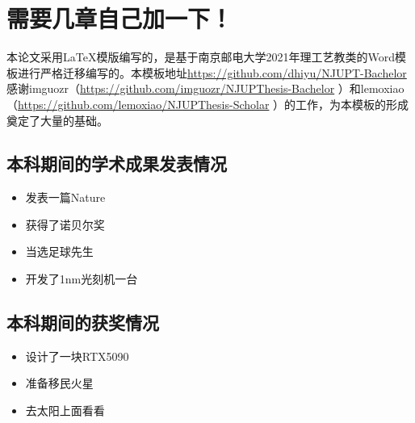 \documentclass[bachelor]{njupthesis}
\begin{document}
\chapter{需要几章自己加一下！}

\thesisconclusion

\thesisacknowledgement

本论文采用\LaTeX 模版编写的，是基于南京邮电大学2021年理工艺教类的Word模板进行严格迁移编写的。本模板地址\url{https://github.com/dhiyu/NJUPT-Bachelor}感谢imguozr（\url{https://github.com/imguozr/NJUPThesis-Bachelor} ）和lemoxiao（\url{https://github.com/lemoxiao/NJUPThesis-Scholar} ）的工作，为本模板的形成奠定了大量的基础。

\thesisreference

\thesisappendix

\section{本科期间的学术成果发表情况}
\begin{itemize}
	\item 发表一篇Nature
	\item 获得了诺贝尔奖
	\item 当选足球先生
	\item 开发了1nm光刻机一台
\end{itemize}

\section{本科期间的获奖情况}
\begin{itemize}
	\item 设计了一块RTX5090
	\item 准备移民火星
	\item 去太阳上面看看
\end{itemize}
\end{document}
